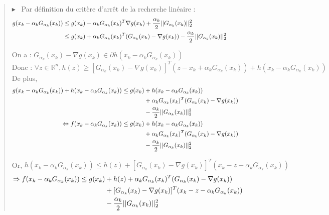 \documentclass[12pt,a4paper]{article}
\newcommand{\preuve}[1]{%
    \begin{quote}
        $\blacktriangleright$~#1
    \end{quote}
}
\begin{document}
\preuve{
    Par définition du critère d'arrêt de la recherche linéaire :
    \begin{align*}
        g(x_k - \alpha_k G_{\alpha_k}(x_k)) &\leq g(x_k) - \alpha_k G_{\alpha_k}(x_k)^T \nabla g(x_k) + \frac{\alpha_k}{2} ||G_{\alpha_k}(x_k)||_2^2 \hspace{14.5cm}\\
        &\leq g(x_k) + \alpha_k G_{\alpha_k}(x_k)^T (G_{\alpha_k}(x_k) - \nabla g(x_k)) - \frac{\alpha_k}{2} ||G_{\alpha_k}(x_k)||_2^2
    \end{align*}
    
    On a : $G_{\alpha_k}(x_k) - \nabla g(x_k) \in \partial h(x_k - \alpha_k G_{\alpha_k}(x_k))$\\
    Donc : $\forall z \in \mathbb{R}^n, h(z) \geq [G_{\alpha_k}(x_k) - \nabla g(x_k)]^T (z - x_k + \alpha_k G_{\alpha_k}(x_k)) + h(x_k - \alpha_k G_{\alpha_k}(x_k))$\\
    
    De plus,
    \begin{align*}
        g(x_k - \alpha_k G_{\alpha_k}(x_k)) + h(x_k - \alpha_k G_{\alpha_k}(x_k)) \leq g(x_k) &+ h(x_k - \alpha_k G_{\alpha_k}(x_k))\\
        &+ \alpha_k G_{\alpha_k}(x_k)^T (G_{\alpha_k}(x_k) - \nabla g(x_k))\\
        &- \frac{\alpha_k}{2} ||G_{\alpha_k}(x_k)||_2^2 \hspace{14.5cm}\\
        \Leftrightarrow f(x_k - \alpha_k G_{\alpha_k}(x_k)) \leq g(x_k) &+ h(x_k - \alpha_k G_{\alpha_k}(x_k))\\
        &+ \alpha_k G_{\alpha_k}(x_k)^T (G_{\alpha_k}(x_k) - \nabla g(x_k))\\
        &- \frac{\alpha_k}{2} ||G_{\alpha_k}(x_k)||_2^2
    \end{align*}
    
    Or, $h(x_k - \alpha_k G_{\alpha_k}(x_k)) \leq h(z) + [G_{\alpha_k}(x_k) - \nabla g(x_k)]^T (x_k - z - \alpha_k G_{\alpha_k}(x_k))$\\
    \begin{align*}
        \Rightarrow f(x_k - \alpha_k G_{\alpha_k}(x_k)) \leq g(x_k) &+ h(z) + \alpha_k G_{\alpha_k}(x_k)^T (G_{\alpha_k}(x_k) - \nabla g(x_k))\\
        &+ [G_{\alpha_k}(x_k) - \nabla g(x_k)]^T (x_k - z - \alpha_k G_{\alpha_k}(x_k))\\
        &- \frac{\alpha_k}{2} ||G_{\alpha_k}(x_k)||_2^2 \hspace{14.5cm}\\
    \end{align*}
    
}
\end{document}
